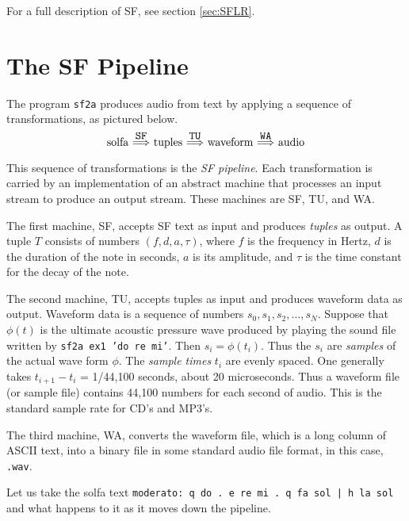 \documentclass[11pt]{amsart}
\newcommand{\mapright}[1]{\ \smash{ 
   \mathop{\Longrightarrow}\limits^{#1}}\ }
\begin{document}
For a full description of SF, see section \ref{sec:SFLR}.





\section{The SF Pipeline}

The program {\tt sf2a} produces audio from text by applying a sequence of transformations, as pictured below. 

\[
  \hbox{solfa} 
  \mapright{\hbox{\tt SF}}
  \hbox{tuples}
  \mapright{\hbox{\tt TU}}
  \hbox{waveform}
  \mapright{\hbox{\tt WA}}
  \hbox{audio}
\]

This sequence of transformations is the \emph{SF pipeline}.  
Each transformation is carried by an implementation of
an abstract machine that processes an input stream to produce an output
stream.  These machines are SF, TU, and WA.  

The first machine, SF, accepts
SF text as input and produces \emph{tuples} as output.
A tuple $T$ consists of numbers $(f,d, a, \tau)$,
where $f$ is the frequency in Hertz, $d$ is the duration of the note in seconds,
$a$ is its amplitude, and $\tau$ is the time constant for the decay of the note.

The second machine, TU, accepts tuples as input and produces waveform data as 
output. Waveform data is a sequence of numbers $s_0, s_1, s_2, \ldots, s_N$.
Suppose that $\phi(t)$ is the ultimate acoustic pressure wave produced by playing 
the sound file written by {\tt sf2a ex1 'do re mi'}.  Then $s_i = \phi(t_i)$.
Thus the $s_i$ are \emph{samples} of the actual wave form $\phi$. The \emph{sample times}
$t_i$ are evenly spaced.  One generally takes $t_{i+1} - t_{i}$ = 1/44,100 seconds,
about 20 microseconds.  Thus a waveform file (or sample file) contains 44,100 numbers
for each second of audio. This is the standard sample rate for CD's and MP3's.

The third machine, WA, converts the waveform file, which is a long column of ASCII text,
into a binary file in some standard audio file format, in this case, {\tt.wav}.

Let us take the solfa text {\tt moderato: q do . e re mi . q fa sol | h la sol} and 
what happens to it as it moves down the pipeline.
\end{document}
